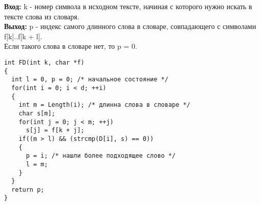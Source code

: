 \documentclass[10pt, a5paper]{article}
\begin{document}

\noindent\textbf{Вход:} k - номер символа в исходном тексте, начиная с которого нужно искать
в тексте слова из словаря.\\
\textbf{Выход:} p - индекс самого длинного слова в словаре, совпадающего с символами
f[k]..f[k + l].\\
Если такого слова в словаре нет, то p = 0.
\begin{lstlisting}
int FD(int k, char *f)
{
  int l = 0, p = 0; /* начальное состояние */
  for(int i = 0; i < d; ++i)
  {
    int m = Length(i); /* длинна слова в словаре */
    char s[m];
    for(int j = 0; j < m; ++j)
      s[j] = f[k + j];
    if((m > l) && (strcmp(D[i], s) == 0))
    {
      p = i; /* нашли более подходящее слово */
      l = m;
    }
  }
  return p;
}
\end{lstlisting}
\end{document}
